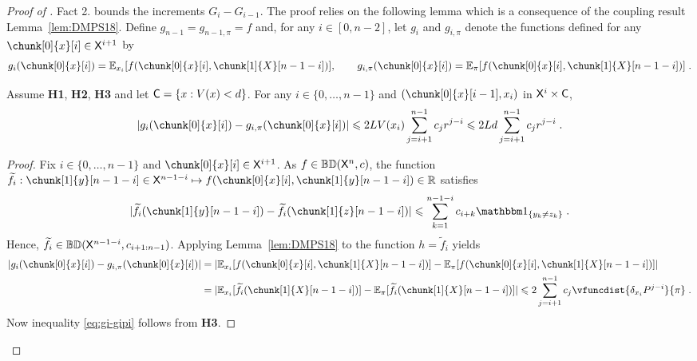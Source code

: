 \documentclass[leqno,11pt,a4paper]{article}
\begin{document}
\begin{proof}[Proof of ]
Fact 2. bounds the increments $G_i-G_{i-1}$. The proof relies on the following lemma which is a consequence of the coupling result Lemma~\ref{lem:DMPS18}.
Define $g_{n-1}=g_{n-1,\pi}=f$ and, for any $i\in [0,n-2]$, let $g_i$ and $g_{i,\pi}$ denote the functions defined for any $\chunk[0]{x}[i]\in\sX^{i+1}$ by 
\begin{equation}
\label{eq:definition-g-i}
g_i(\chunk[0]{x}[i])=\Ebb_{x_i}[f(\chunk[0]{x}[i],\chunk[1]{X}[n-1-i])],\qquad g_{i,\pi}(\chunk[0]{x}[i])=\Ebb_{\pi}[f(\chunk[0]{x}[i],\chunk[1]{X}[n-1-i])]\eqsp.
\end{equation}

\begin{lemma}
\label{lem:gi-gipi}
 Assume {\bf H1}, {\bf H2}, {\bf H3} and let $\mathsf{C} = \{x:V(x) < d\}$. 
 For any $i\in \{0,\ldots,n-1\}$ and $(\chunk[0]{x}[i-1],x_i)$ in $\mathsf{X}^i\times\mathsf{C}$,
\begin{equation}\label{eq:gi-gipi}
|g_i(\chunk[0]{x}[i])-g_{i,\pi}(\chunk[0]{x}[i])|\leqslant 2LV(x_i)\sum_{j=i+1}^{n-1}c_jr^{j-i} \leqslant 2Ld \sum_{j=i+1}^{n-1}c_jr^{j-i}\eqsp.
\end{equation}
\end{lemma}
\begin{proof}
 Fix $i\in\{0,\ldots,n-1\}$ and $\chunk[0]{x}[i]\in \sX^{i+1}$.
As $f\in\mathbb{BD}(\mathsf{X}^n,c)$, the function $\tilde{f}_i:\chunk[1]{y}[n-1-i]\in \sX^{n-1-i}\mapsto f(\chunk[0]{x}[i],\chunk[1]{y}[n-1-i])\in \R$ satisfies
\[
|\tilde{f}_i(\chunk[1]{y}[n-1-i])-\tilde{f}_i(\chunk[1]{z}[n-1-i])|\leqslant \sum_{k=1}^{n-1-i}c_{i+k}\indiacc{y_k\ne z_k}\eqsp.
\]
Hence, $\widetilde{f}_i\in\mathbb{B}\mathbb{D}(\mathsf{X}^{n-1-i},c_{i+1:n-1})$. Applying Lemma~\ref{lem:DMPS18} to the function $h=\tilde{f}_i$ yields
\begin{align*}
 |g_i(\chunk[0]{x}[i])-g_{i,\pi}(\chunk[0]{x}[i])|&=|\Ebb_{x_i}[f(\chunk[0]{x}[i],\chunk[1]{X}[n-1-i])]-\Ebb_{\pi}[f(\chunk[0]{x}[i],\chunk[1]{X}[n-1-i])]|\\
 &=|\Ebb_{x_i}[\tilde{f}_i(\chunk[1]{X}[n-1-i])]-\Ebb_{\pi}[\tilde{f}_i(\chunk[1]{X}[n-1-i])]| \leqslant 2\sum_{j=i+1}^{n-1}c_j \vfuncdist{\delta_{x_i}P^{j-i}}{\pi} \eqsp.
\end{align*}
Now inequality \eqref{eq:gi-gipi} follows from {\bf H3}.
\end{proof}






\end{proof}
\end{document}
